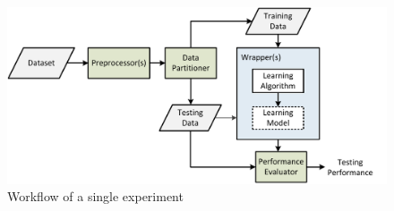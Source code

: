 \begin{figure}[t]
\centering
\includegraphics[scale=0.6]{./images/Disegno3}
\caption{Workflow of a single experiment}
\label{fig:workflow}
\end{figure}